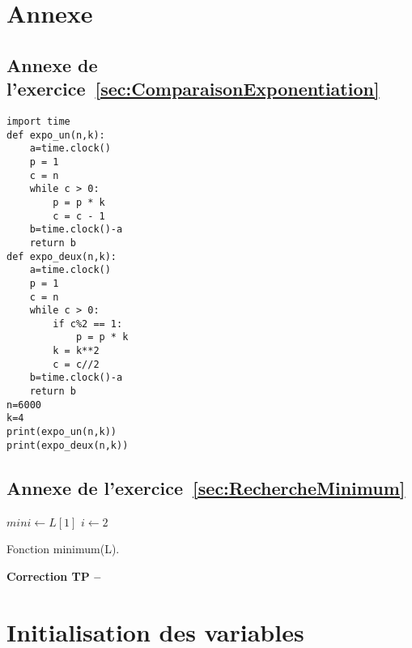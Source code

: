 \newpage
\section*{Annexe}

\subsection*{Annexe de l'exercice~\ref{sec:ComparaisonExponentiation}}

\begin{boxedminipage}{\textwidth}
\begin{verbatim}
import time
def expo_un(n,k):
    a=time.clock()
    p = 1
    c = n
    while c > 0:
        p = p * k
        c = c - 1
    b=time.clock()-a
    return b
def expo_deux(n,k):
    a=time.clock()
    p = 1
    c = n
    while c > 0:
        if c%2 == 1:
            p = p * k
        k = k**2
        c = c//2
    b=time.clock()-a
    return b
n=6000
k=4
print(expo_un(n,k))
print(expo_deux(n,k))
\end{verbatim}
\end{boxedminipage}

\subsection*{Annexe de l'exercice~\ref{sec:RechercheMinimum}}
\begin{algorithm}[H]
$mini \leftarrow L[1]$ \;
$i \leftarrow 2$ \;
\caption{Fonction minimum(L).}
\label{algo:recherchetantque}
\end{algorithm}

\ifdef{\public}{}{}
\cleardoublepage
\renewcommand{\type}{Correction TP}
\setcounter{section}{0}
\begin{center}
{\Large\bf {\type} \no {\num} -- \descrip}
\end{center}


\section{Initialisation des variables}


